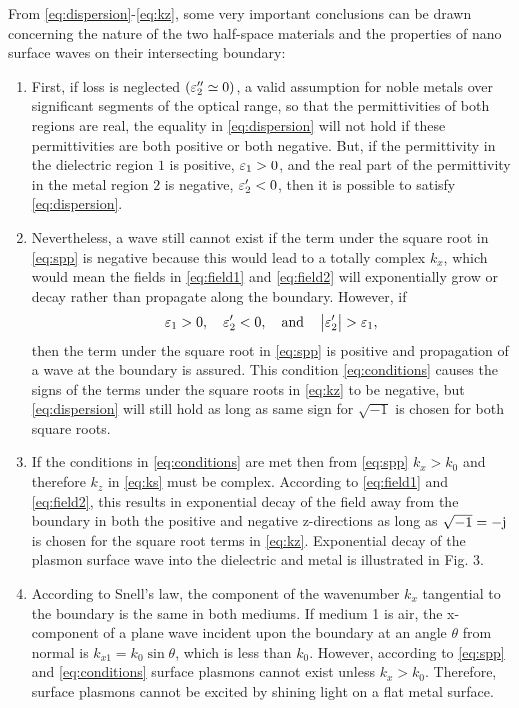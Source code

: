 \documentclass[11pt]{article}
\begin{document}
%
From \eqref{eq:dispersion}-\eqref{eq:kz}, some very important conclusions can be drawn concerning the nature of the two half-space materials and the properties of nano surface waves on their intersecting boundary:
%
\begin{enumerate}
  \item First, if loss is neglected $(\varepsilon_2'' \simeq 0)$, a valid assumption for noble metals over significant segments of the optical range, so that the permittivities of both regions are real, the equality in \eqref{eq:dispersion} will not hold if these permittivities are both positive or both negative. But, if the permittivity in the dielectric region $1$ is positive, $\varepsilon_1 > 0$, and the real part of the permittivity in the metal region $2$ is negative, $\varepsilon_2' < 0$, then it is possible to satisfy \eqref{eq:dispersion}.
  \item	Nevertheless, a wave still cannot exist if the term under the square root in \eqref{eq:spp} is negative because this would lead to a totally complex $k_x$, which would mean the fields in \eqref{eq:field1} and \eqref{eq:field2} will exponentially grow or decay rather than propagate along the boundary. However, if
  \begin{equation}
    \varepsilon_1 > 0, \quad		 \varepsilon_2' < 0, \quad   \text{and}  \quad \left| \varepsilon_2' \right| > \varepsilon_1,
    \label{eq:conditions}
  \end{equation}
  then the term under the square root in \eqref{eq:spp} is positive and propagation of a wave at the boundary is assured. This condition \eqref{eq:conditions} causes the signs of the terms under the square roots in \eqref{eq:kz} to be negative, but \eqref{eq:dispersion} will still hold as long as same sign for $\sqrt{-1}$ is chosen for both square roots.
  \item	If the conditions in \eqref{eq:conditions} are met then from \eqref{eq:spp} $k_x > k_0$ and therefore $k_z$ in \eqref{eq:ks} must be complex. According to \eqref{eq:field1} and \eqref{eq:field2}, this results in exponential decay of the field away from the boundary in both the positive and negative z-directions as long as $\sqrt{-1} = -\mathrm{j}\mkern1mu$ is chosen for the square root terms in \eqref{eq:kz}. Exponential decay of the plasmon surface wave into the dielectric and metal is illustrated in Fig. 3.
  \item	According to Snell's law, the component of the wavenumber $k_x$ tangential to the boundary is the same in both mediums. If medium 1 is air, the x-component of a plane wave incident upon the boundary at an angle $\theta$ from normal is $k_{x1} = k_0 \sin \theta$, which is less than $k_0$. However, according to \eqref{eq:spp} and \eqref{eq:conditions} surface plasmons cannot exist unless $k_x > k_0$. Therefore, surface plasmons cannot be excited by shining light on a flat metal surface.

\end{enumerate}
\end{document}
